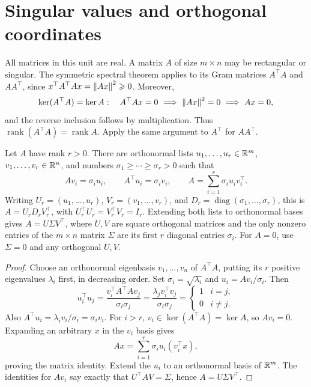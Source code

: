 \section*{Singular values and orthogonal coordinates}
All matrices in this unit are real. A matrix \(A\) of size \(m\times n\)
may be rectangular or singular. The symmetric spectral theorem applies
to its Gram matrices \(A^\top A\) and \(AA^\top\), since
\(x^\top A^\top Ax=\left\lVert Ax\right\rVert^2\geqslant0\). Moreover,
\[
\ker(A^\top A)=\ker A:
\quad A^\top Ax=0\ \Longrightarrow\ \norm{Ax}^2=0\ \Longrightarrow\ Ax=0,
\]
and the reverse inclusion follows by multiplication. Thus
\(\operatorname{rank}(A^\top A)=\operatorname{rank}A\). Apply the same
argument to \(A^\top\) for \(AA^\top\).

\begin{theorem}
Let \(A\) have rank \(r>0\). There are orthonormal lists
\(u_1,\ldots,u_r\in\mathbb R^m\), \(v_1,\ldots,v_r\in\mathbb R^n\), and numbers
\(\sigma_1\geqslant\cdots\geqslant\sigma_r>0\) such that
\[
Av_i=\sigma_i u_i,\qquad A^\top u_i=\sigma_i v_i,
\qquad A=\sum_{i=1}^r\sigma_i u_i v_i^\top.
\]
Writing \(U_r=(u_1,\ldots,u_r)\), \(V_r=(v_1,\ldots,v_r)\), and
\(D_r=\operatorname{diag}(\sigma_1,\ldots,\sigma_r)\), this is
\(A=U_rD_rV_r^\top\), with \(U_r^\top U_r=V_r^\top V_r=I_r\).
Extending both lists to orthonormal bases gives \(A=U\Sigma V^\top\),
where \(U,V\) are square orthogonal matrices and the only nonzero entries
of the \(m\times n\) matrix \(\Sigma\) are its first \(r\) diagonal entries
\(\sigma_i\). For \(A=0\), use \(\Sigma=0\) and any orthogonal \(U,V\).
\end{theorem}
\begin{proof}
Choose an orthonormal eigenbasis \(v_1,\ldots,v_n\) of \(A^\top A\),
putting its \(r\) positive eigenvalues \(\lambda_i\) first, in decreasing
order. Set \(\sigma_i=\sqrt{\lambda_i}\) and \(u_i=Av_i/\sigma_i\).
Then
\[
u_i^\top u_j=\frac{v_i^\top A^\top Av_j}{\sigma_i\sigma_j}
=\frac{\lambda_jv_i^\top v_j}{\sigma_i\sigma_j}
=\begin{cases}1&i=j,\\0&i\ne j.\end{cases}
\]
Also \(A^\top u_i=\lambda_i v_i/\sigma_i=\sigma_i v_i\).
For \(i>r\), \(v_i\in\ker(A^\top A)=\ker A\), so \(Av_i=0\).
Expanding an arbitrary \(x\) in the \(v_i\) basis gives
\[
Ax=\sum_{i=1}^r\sigma_i u_i(v_i^\top x),
\]
proving the matrix identity. Extend the \(u_i\) to an orthonormal basis
of \(\mathbb R^m\). The identities for \(Av_i\) say exactly that
\(U^\top AV=\Sigma\), hence \(A=U\Sigma V^\top\).
\end{proof}

